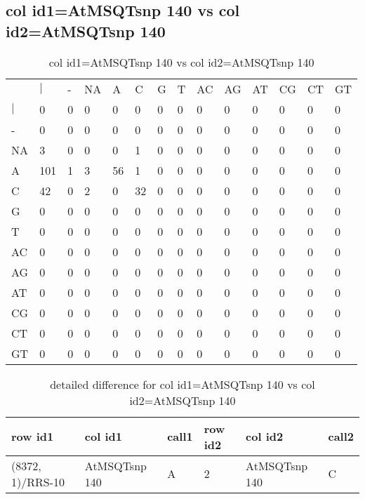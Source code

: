 \subsection{col id1=AtMSQTsnp 140 vs col id2=AtMSQTsnp 140}
\begin{center}
\begin{longtable}{|l|l|l|l|l|l|l|l|l|l|l|l|l|l|}
\caption{col id1=AtMSQTsnp 140 vs col id2=AtMSQTsnp 140} \label{table_dm520}\\
\hline
\\
\hline
&$|$&-&NA&A&C&G&T&AC&AG&AT&CG&CT&GT\\
$|$&0&0&0&0&0&0&0&0&0&0&0&0&0\\
-&0&0&0&0&0&0&0&0&0&0&0&0&0\\
NA&3&0&0&0&1&0&0&0&0&0&0&0&0\\
A&101&1&3&56&1&0&0&0&0&0&0&0&0\\
C&42&0&2&0&32&0&0&0&0&0&0&0&0\\
G&0&0&0&0&0&0&0&0&0&0&0&0&0\\
T&0&0&0&0&0&0&0&0&0&0&0&0&0\\
AC&0&0&0&0&0&0&0&0&0&0&0&0&0\\
AG&0&0&0&0&0&0&0&0&0&0&0&0&0\\
AT&0&0&0&0&0&0&0&0&0&0&0&0&0\\
CG&0&0&0&0&0&0&0&0&0&0&0&0&0\\
CT&0&0&0&0&0&0&0&0&0&0&0&0&0\\
GT&0&0&0&0&0&0&0&0&0&0&0&0&0\\
\hline
\end{longtable}
\end{center}

\begin{center}
\begin{longtable}{|l|l|l|l|l|l|}
\caption{detailed difference for col id1=AtMSQTsnp 140 vs col id2=AtMSQTsnp 140} \label{table_dm521}\\
\hline
row id1&col id1&call1&row id2&col id2&call2\\
\hline
(8372, 1)/RRS-10&AtMSQTsnp 140&A&2&AtMSQTsnp 140&C\\
\hline
\end{longtable}
\end{center}

